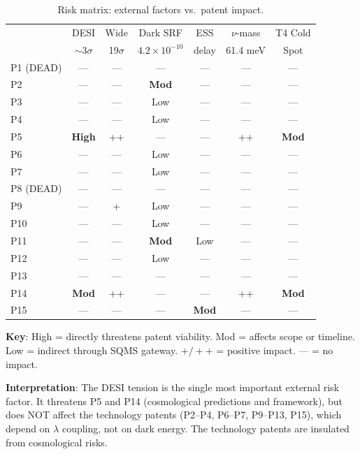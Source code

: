 \documentclass[11pt]{article}
\newcommand{\ee}[1]{\times 10^{#1}}
\begin{document}
\begin{table}[H]
\centering
\caption{Risk matrix: external factors vs.\ patent impact.}
\label{tab:risk-matrix}
\begin{tabular}{@{}lcccccc@{}}
\toprule
& DESI & Wide & Dark SRF & ESS & $\nu$-mass & T4 Cold \\
& $\sim$3$\sigma$ & 19$\sigma$ & $4.2\ee{-10}$ & delay & 61.4 meV & Spot \\
\midrule
P1 (DEAD) & --- & --- & --- & --- & --- & --- \\
P2 & --- & --- & \textbf{Mod} & --- & --- & --- \\
P3 & --- & --- & Low & --- & --- & --- \\
P4 & --- & --- & Low & --- & --- & --- \\
P5 & \textbf{High} & \textcolor{green!50!black}{++} & --- & --- & \textcolor{green!50!black}{++} & \textbf{Mod} \\
P6 & --- & --- & Low & --- & --- & --- \\
P7 & --- & --- & Low & --- & --- & --- \\
P8 (DEAD) & --- & --- & --- & --- & --- & --- \\
P9 & --- & \textcolor{green!50!black}{+} & Low & --- & --- & --- \\
P10 & --- & --- & Low & --- & --- & --- \\
P11 & --- & --- & \textbf{Mod} & Low & --- & --- \\
P12 & --- & --- & Low & --- & --- & --- \\
P13 & --- & --- & --- & --- & --- & --- \\
P14 & \textbf{Mod} & \textcolor{green!50!black}{++} & --- & --- & \textcolor{green!50!black}{++} & \textbf{Mod} \\
P15 & --- & --- & --- & \textbf{Mod} & --- & --- \\
\bottomrule
\end{tabular}
\end{table}

\textbf{Key}: High = directly threatens patent viability. Mod = affects
scope or timeline. Low = indirect through SQMS gateway. $+/++$ = positive
impact. --- = no impact.

\textbf{Interpretation}: The DESI tension is the single most important
external risk factor. It threatens P5 and P14 (cosmological predictions
and framework), but does NOT affect the technology patents (P2--P4,
P6--P7, P9--P13, P15), which depend on $\lambda$ coupling, not on dark
energy. The technology patents are insulated from cosmological risks.
\end{document}
